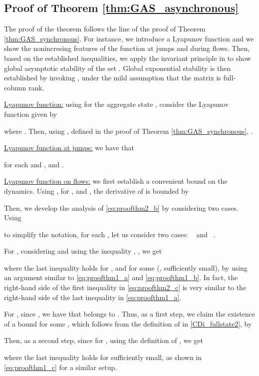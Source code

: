 \documentclass[twocolumn]{autart}
\begin{document}
{
\subsection{Proof of Theorem \ref{thm:GAS_asynchronous}}
\label{sec:proof_thm2}

The proof of the theorem follows the line of the proof of Theorem \ref{thm:GAS_synchronous}.
For instance, we introduce a Lyapunov function and we show the nonincresing features
of the function
at jumps and during flows. Then, based on the established inequalities, we apply
the invariant principle in \cite[Theorem 23]{GoebelCSM09} to show global asymptotic
stability of the set . Global exponential stability is then established
by invoking \cite[Theorem 2]{TeelTAC13}, under the mild assumption that
the matrix  is full-column rank.
}

{ \underline{Lyapunov function:}} 
using  for the aggregate state ,
consider the Lyapunov function 
 given by

where . Then, using , 
defined in the proof of Theorem \ref{thm:GAS_synchronous}, 
.

{ \underline{Lyapunov function at jumps:}} we have that

for each  and ,
and .

{ \underline{Lyapunov function on flows:}}
{ we first establish a convenient bound on the dynamics.} Using
,
for , and 
,
the derivative of  is bounded by 


{Then, we develop the analysis of \eqref{eq:proofthm2_b}
by considering two cases}. Using 

to simplify the notation, for each , 
let us consider two cases: ~
and ~. 

For , 
considering   and using the inequality
, , we get

where the last inequality holds for ,
and for some  (,  sufficiently small),
by using an argument similar to
\eqref{eq:proofthm1_a} and \eqref{eq:proofthm1_b}.
In fact, the right-hand side of the first inequality in 
\eqref{eq:proofthm2_c} is very similar to 
the right-hand side of the last inequality in \eqref{eq:proofthm1_a}.

For , since , we have that
 belongs to . Thus,
as a first step, we claim the existence of a bound 
 for some 
, 
which follows from 
the definition of  in 
\eqref{CDi_fullstate2}, by

Then, as a second step, since 
for , 
using the definition of , we get 

where the last inequality holds for  sufficiently small, 
as shown in \eqref{eq:proofthm1_c} for a similar setup.
\end{document}
